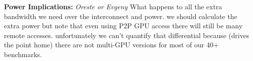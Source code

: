 \textbf{Power Implications:} \textit{Oreste or Evgeny}
What happens to all the extra bandwidth we need over the interconnect and
power.  we should calculate the extra power but note that even using P2P GPU
access there will still be many remote accesses.  unfortunately we can't quantify
that differential because (drives the point home) there are not multi-GPU versions
for most of our 40+ benchmarks.

% 
